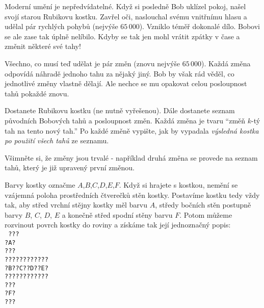 





Moderní umění je nepředvídatelné.
Když si posledně Bob uklízel pokoj,
našel svojí starou Rubikovu kostku.
Zavřel oči, naslouchal svému vnitřnímu hlasu
a udělal pár rychlých pohybů (nejvýše $65\,000$).
Vzniklo téměř dokonalé dílo.
Bobovi se ale zase tak úplně nelíbilo.
Kdyby se tak jen mohl vrátit zpátky v čase a změnit některé své tahy!

Všechno, co musí teď udělat je pár změn (znovu nejvýše $65\,000$).
Každá změna odpovídá náhradě jednoho tahu za nějaký jiný.
Bob by však rád věděl, co jednotlivé změny vlastně dělají.
Ale nechce se mu opakovat celou posloupnost tahů pokaždé znovu.


Dostanete Rubikovu kostku (ne nutně vyřešenou).
Dále dostanete seznam původních Bobových tahů a posloupnost změn.
Každá změna je tvaru ``změň $k$-tý tah na tento nový tah.''
Po každé změně vypište, jak by vypadala \textit{výsledná kostka
po použití všech tahů} ze seznamu.

Všimněte si, že změny jsou trvalé - například druhá změna
se provede na seznam tahů, který je již upravený první změnou.


Barvy kostky označme $A$,$B$,$C$,$D$,$E$,$F$.
Když si hrajete s kostkou, nemění
se vzájemná poloha prostředních čtverečků stěn kostky.
Postavíme kostku tedy vždy tak, aby střed vrchní stějny
kostky měl barvu $A$, středy bočních stěn postupně barvy $B$, $C$, $D$, $E$
a konečně střed spodní stěny barvu $F$.
Potom můžeme rozvinout povrch kostky do roviny a získáme
tak její jednoznačný popis:\\
\texttt{
???\\
?A?\\
???\\
????????????\\
?B??C??D??E?\\
????????????\\
???\\
?F?\\
???\\
}


